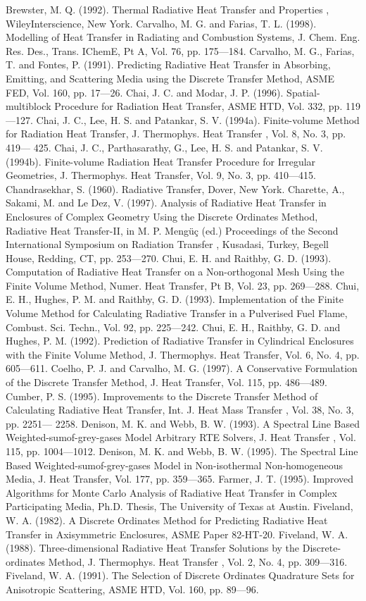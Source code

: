 \documentclass[11pt,a4paper,openany,fontset=none]{ctexbook}
\begin{document}
\begin{sloppypar}
{\small Brewster, M. Q. (1992). Thermal Radiative Heat Transfer and Properties , WileyInterscience, New York. Carvalho, M. G. and Farias, T. L. (1998). Modelling of Heat Transfer in Radiating and Combustion Systems, J. Chem. Eng. Res. Des., Trans. IChemE, Pt A, Vol. 76, pp. 175—184. Carvalho, M. G., Farias, T. and Fontes, P. (1991). Predicting Radiative Heat Transfer in Absorbing, Emitting, and Scattering Media using the Discrete Transfer Method, ASME FED, Vol. 160, pp. 17—26. Chai, J. C. and Modar, J. P. (1996). Spatial-multiblock Procedure for Radiation Heat Transfer, ASME HTD, Vol. 332, pp. 119—127. Chai, J. C., Lee, H. S. and Patankar, S. V. (1994a). Finite-volume Method for Radiation Heat Transfer, J. Thermophys. Heat Transfer , Vol. 8, No. 3, pp. 419— 425. Chai, J. C., Parthasarathy, G., Lee, H. S. and Patankar, S. V. (1994b). Finite-volume Radiation Heat Transfer Procedure for Irregular Geometries, J. Thermophys. Heat Transfer, Vol. 9, No. 3, pp. 410—415. Chandrasekhar, S. (1960). Radiative Transfer, Dover, New York. Charette, A., Sakami, M. and Le Dez, V. (1997). Analysis of Radiative Heat Transfer in Enclosures of Complex Geometry Using the Discrete Ordinates Method, Radiative Heat Transfer-II, in M. P. Mengüç (ed.) Proceedings of the Second International Symposium on Radiation Transfer , Kusadasi, Turkey, Begell House, Redding, CT, pp. 253—270. Chui, E. H. and Raithby, G. D. (1993). Computation of Radiative Heat Transfer on a Non-orthogonal Mesh Using the Finite Volume Method, Numer. Heat Transfer, Pt B, Vol. 23, pp. 269—288. Chui, E. H., Hughes, P. M. and Raithby, G. D. (1993). Implementation of the Finite Volume Method for Calculating Radiative Transfer in a Pulverised Fuel Flame, Combust. Sci. Techn., Vol. 92, pp. 225—242. Chui, E. H., Raithby, G. D. and Hughes, P. M. (1992). Prediction of Radiative Transfer in Cylindrical Enclosures with the Finite Volume Method, J. Thermophys. Heat Transfer, Vol. 6, No. 4, pp. 605—611. Coelho, P. J. and Carvalho, M. G. (1997). A Conservative Formulation of the Discrete Transfer Method, J. Heat Transfer, Vol. 115, pp. 486—489. Cumber, P. S. (1995). Improvements to the Discrete Transfer Method of Calculating Radiative Heat Transfer, Int. J. Heat Mass Transfer , Vol. 38, No. 3, pp. 2251— 2258. Denison, M. K. and Webb, B. W. (1993). A Spectral Line Based Weighted-sumof-grey-gases Model Arbitrary RTE Solvers, J. Heat Transfer , Vol. 115, pp. 1004—1012. Denison, M. K. and Webb, B. W. (1995). The Spectral Line Based Weighted-sumof-grey-gases Model in Non-isothermal Non-homogeneous Media, J. Heat Transfer, Vol. 177, pp. 359—365. Farmer, J. T. (1995). Improved Algorithms for Monte Carlo Analysis of Radiative Heat Transfer in Complex Participating Media, Ph.D. Thesis, The University of Texas at Austin. Fiveland, W. A. (1982). A Discrete Ordinates Method for Predicting Radiative Heat Transfer in Axisymmetric Enclosures, ASME Paper 82-HT-20. Fiveland, W. A. (1988). Three-dimensional Radiative Heat Transfer Solutions by the Discrete-ordinates Method, J. Thermophys. Heat Transfer , Vol. 2, No. 4, pp. 309—316. Fiveland, W. A. (1991). The Selection of Discrete Ordinates Quadrature Sets for Anisotropic Scattering, ASME HTD, Vol. 160, pp. 89—96.}\par

\end{sloppypar}
\end{document}
